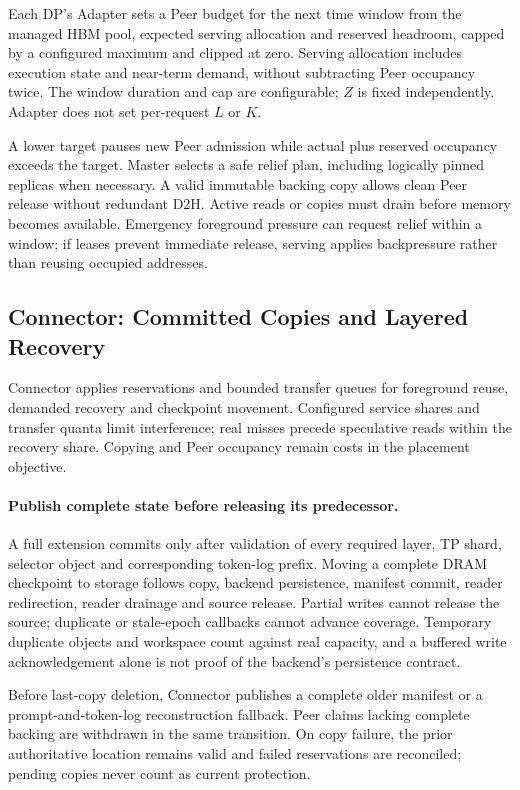 Each DP's Adapter sets a Peer budget for the next time window from the
managed HBM pool, expected serving allocation and reserved headroom,
capped by a configured maximum and clipped at zero. Serving allocation
includes execution state and near-term demand, without subtracting Peer
occupancy twice. The window duration and cap are configurable; $Z$ is
fixed independently. Adapter does not set per-request $L$ or $K$.

A lower target pauses new Peer admission while actual plus reserved
occupancy exceeds the target. Master selects a safe relief plan, including
logically pinned replicas when necessary. A valid immutable backing copy
allows clean Peer release without redundant D2H. Active reads or copies
must drain before memory becomes available. Emergency foreground pressure
can request relief within a window; if leases prevent immediate release,
serving applies backpressure rather than reusing occupied addresses.

\subsection{Connector: Committed Copies and Layered Recovery}
\label{sec:connector}

Connector applies reservations and bounded transfer queues for foreground
reuse, demanded recovery and checkpoint movement. Configured service
shares and transfer quanta limit interference; real misses precede
speculative reads within the recovery share. Copying and Peer occupancy
remain costs in the placement objective.

\paragraph{Publish complete state before releasing its predecessor.}
A full extension commits only after validation of every required layer,
TP shard, selector object and corresponding token-log prefix. Moving a
complete DRAM checkpoint to storage follows copy, backend persistence,
manifest commit, reader redirection, reader drainage and source release.
Partial writes cannot release the source; duplicate or stale-epoch
callbacks cannot advance coverage. Temporary duplicate objects and
workspace count against real capacity, and a buffered write acknowledgement
alone is not proof of the backend's persistence contract.

Before last-copy deletion, Connector publishes a complete older manifest
or a prompt-and-token-log reconstruction fallback. Peer claims lacking
complete backing are withdrawn in the same transition. On copy failure,
the prior authoritative location remains valid and failed reservations
are reconciled; pending copies never count as current protection.

